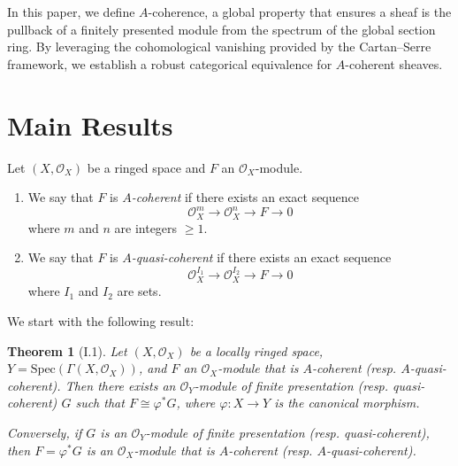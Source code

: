 \documentclass[a4paper]{amsart}
\newtheorem{theorem}{Theorem}[section]
\theoremstyle{definition}
\theoremstyle{definition}
\begin{document}
In this paper, we define $A$-coherence, a global property that ensures a sheaf is the pullback of a finitely presented module from the spectrum of the global section ring. By leveraging the cohomological vanishing provided by the Cartan--Serre framework, we establish a robust categorical equivalence for $A$-coherent sheaves.


\section{Main Results}


Let $(X, \mathcal{O}_X)$ be a ringed space and $F$ an $\mathcal{O}_X$-module.

\begin{enumerate}
    \item We say that $F$ is \emph{$A$\nobreakdash-coherent} if there exists an exact sequence
    \[
    \mathcal{O}_X^{m} \longrightarrow \mathcal{O}_X^{n} \longrightarrow F \longrightarrow 0
    \]
    where $m$ and $n$ are integers $\geq 1$.
    
    \item We say that $F$ is \emph{$A$\nobreakdash-quasi-coherent} if there exists an exact sequence
    \[
    \mathcal{O}_X^{I_1} \longrightarrow \mathcal{O}_X^{I_2} \longrightarrow F \longrightarrow 0
    \]
    where $I_1$ and $I_2$ are sets.
\end{enumerate}



We start with the following result:

\begin{theorem}[I.1]
Let $(X, \mathcal{O}_X)$ be a locally ringed space, $Y = \mathrm{Spec}(\Gamma(X, \mathcal{O}_X))$, and $F$ an $\mathcal{O}_X$-module that is $A$\nobreakdash-coherent (resp. $A$\nobreakdash-quasi-coherent). Then there exists an $\mathcal{O}_Y$-module of finite presentation (resp. quasi-coherent) $G$ such that $F \cong \varphi^{\ast} G$, where $\varphi : X \to Y$ is the canonical morphism.

Conversely, if $G$ is an $\mathcal{O}_Y$-module of finite presentation (resp. quasi-coherent), then $F = \varphi^{\ast} G$ is an $\mathcal{O}_X$-module that is $A$\nobreakdash-coherent (resp. $A$\nobreakdash-quasi-coherent).
\end{theorem}
\end{document}
